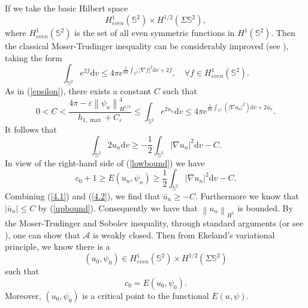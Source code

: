 \documentclass[a4paper, 12pt]{article}
\begin{document}
If we take the basic Hilbert space \begin{equation*}
	H_{even}^1\left( {{\mathbb{S}^2}} \right) \times {H^{1/2}}\left( {\Sigma {\mathbb{S}^2}} \right),
\end{equation*}
where $H_{even}^1\left( {{\mathbb{S}^2}} \right)$ is the set of all even symmetric functions in $H^{1}(\mathbb{S}^2) $. Then the classical Moser-Trudinger inequality can be considerably improved (see \cite{MR339258}), taking the form
\begin{equation*}
	\int_{{\mathbb{S}^2}} {{e^{2f}}{\text{d}{v}} \leq } 4\pi {e^{\frac{1}{{8\pi }}\int_{{\mathbb{S}^2}} {{{\left| {\nabla f} \right|}^2}{\text{d}{v}}}  + 2\overline f }},\quad \forall f \in H_{even}^1\left( {{\mathbb{S}^2}} \right).
\end{equation*}
As in (\ref{epsilon}), there exists a constant $C$ such that
\begin{equation*}
	0<C<\frac{{4\pi  - \varepsilon {{\left\| \psi_n  \right\|}_{H^{1/2}}^4}}}{{{h_{1,\max}} + {C_\varepsilon }}} \leq \int_{{\mathbb{S}^2}} {{e^{2u_n}}} {\text{d}{v}} \leq 4\pi {e^{\frac{1}{{8\pi }}\int_{{\mathbb{S}^2}} {\left( {{{\left| {\nabla u_n} \right|}^2} } \right){\text{d}{v}+ 2 \bar u_n} }}}.
\end{equation*}
It follows that
\begin{equation*}
	\int_{{\mathbb{S}^2}} {2{u_n}} {\text{d}{v}} \geq  - \frac{1}{2}\int_{{\mathbb{S}^2}} {{{\left| {\nabla {u_n}} \right|}^2}{\text{d}{v}}}  - C.\end{equation*}
In view of the right-hand side of (\ref{lowbound}) we have
\begin{equation}\label{4.2}
	{c_0} + 1 \geq E\left( {{u_n},{\psi _n}} \right) \geq \frac{1}{2}\int_{{\mathbb{S}^2}} {{{\left| {\nabla {u_n}} \right|}^2}{\text{d}{v}}}-C .\end{equation}
Combining (\ref{4.1}) and (\ref{4.2}), we find that $\bar {u}_n\geq -C$. Furthermore we know that $|\bar{u}_n|\leq C$ by (\ref{upbound}). Consequently we have that $\left\| {{u_n}} \right\|_{H^1}$ is bounded. By the Moser-Trudinger and Sobolev inequality, through standard arguments (or see \cite[Lemma3.3]{jevnikar2020existence1}), one can show that \( \mathcal{A} \) is weakly closed. Then from Ekeland's variational principle, we know there is a
\begin{equation*}
	\left( {{u_0},{\psi _0}} \right) \in H_{even}^1\left( {{\mathbb{S}^2}} \right) \times {H^{1/2}}\left( {\Sigma {\mathbb{S}^2}} \right)
\end{equation*}
such that
\begin{equation*}
	{c_0} = E\left( {{u_0},{\psi _0}} \right).
\end{equation*}
Moreover, $\left( {{u_0},{\psi _0}} \right)$ is a critical point to the functional $E\left( {u,\psi } \right)$.
\end{document}
